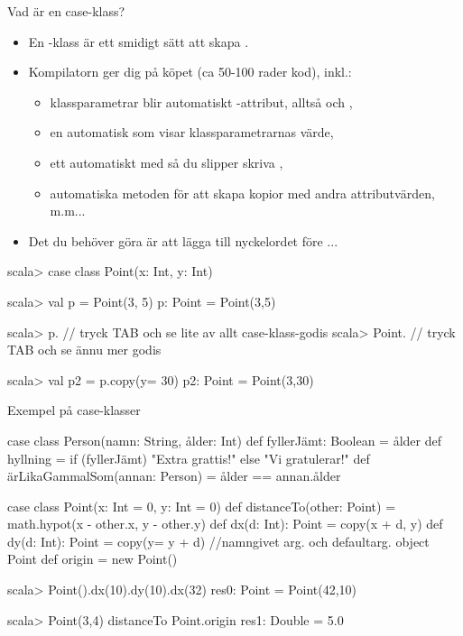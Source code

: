 \begin{Slide}{Vad är en case-klass?}\SlideFontSmall
\setlength{\leftmargini}{0pt}
\begin{itemize}
\item En -klass är ett smidigt sätt att skapa .
\item Kompilatorn ger dig  på köpet (ca 50-100 rader kod), inkl.:
\begin{itemize}\SlideFontTiny
\item klassparametrar blir automatiskt -attribut, alltså  och ,
\item en automatisk  som visar klassparametrarnas värde, 
\item ett automatiskt  med  så du slipper skriva ,
\item automatiska metoden  för att skapa kopior med andra attributvärden, m.m...
\end{itemize}

\pause
\item Det  du behöver göra är att lägga till nyckelordet  före ...
\end{itemize}

\vspace{-0.5em}\begin{REPLnonum}
scala> case class Point(x: Int, y: Int)

scala> val p = Point(3, 5)
p: Point = Point(3,5)

scala> p.  // tryck TAB och se lite av allt case-klass-godis
scala> Point.  // tryck TAB och se ännu mer godis

scala> val p2 = p.copy(y= 30)
p2: Point = Point(3,30)
\end{REPLnonum}


\end{Slide}


\begin{Slide}{Exempel på case-klasser} 
\begin{Code}
case class Person(namn: String, ålder: Int) {
  def fyllerJämt: Boolean = ålder %
  def hyllning = if (fyllerJämt) "Extra grattis!" else "Vi gratulerar!"
  def ärLikaGammalSom(annan: Person) = ålder == annan.ålder
}

case class Point(x: Int = 0, y: Int = 0) {
  def distanceTo(other: Point) = math.hypot(x - other.x, y - other.y)
  def dx(d: Int): Point = copy(x + d, y)
  def dy(d: Int): Point = copy(y= y + d)  //namngivet arg. och defaultarg.
}
object Point { 
  def origin = new Point() 
}
\end{Code}

\begin{REPL}
scala> Point().dx(10).dy(10).dx(32)
res0: Point = Point(42,10)

scala> Point(3,4) distanceTo Point.origin
res1: Double = 5.0

\end{REPL}
\end{Slide}

